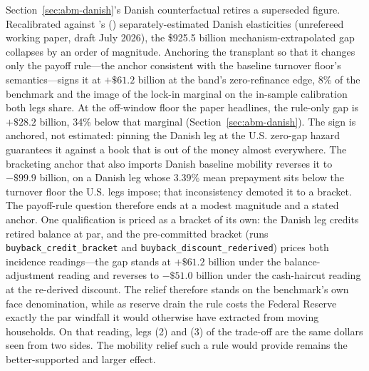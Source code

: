 \documentclass[12pt]{article}
\newcommand{\citepos}[1]{\citeauthor{#1}'s (\citeyear{#1})}
\begin{document}
Section~\ref{sec:abm-danish}'s Danish counterfactual retires a superseded figure. Recalibrated against \citepos{berger2026} separately-estimated Danish elasticities (unrefereed working paper, draft July 2026), the \$925.5 billion mechanism-extrapolated gap collapses by an order of magnitude. Anchoring the transplant so that it changes only the payoff rule---the anchor consistent with the baseline turnover floor's semantics---signs it at $+\$61.2$ billion at the band's zero-refinance edge, 8\% of the benchmark and the image of the lock-in marginal on the in-sample calibration both legs share. At the off-window floor the paper headlines, the rule-only gap is $+\$28.2$ billion, 34\% below that marginal (Section~\ref{sec:abm-danish}). The sign is anchored, not estimated: pinning the Danish leg at the U.S. zero-gap hazard guarantees it against a book that is out of the money almost everywhere. The bracketing anchor that also imports Danish baseline mobility reverses it to $-\$99.9$ billion, on a Danish leg whose 3.39\% mean prepayment sits below the turnover floor the U.S. legs impose; that inconsistency demoted it to a bracket. The payoff-rule question therefore ends at a modest magnitude and a stated anchor. One qualification is priced as a bracket of its own: the Danish leg credits retired balance at par, and the pre-committed bracket (runs \texttt{buyback\_credit\_bracket} and \texttt{buyback\_discount\_rederived}) prices both incidence readings---the gap stands at $+\$61.2$ billion under the balance-adjustment reading and reverses to $-\$51.0$ billion under the cash-haircut reading at the re-derived discount. The relief therefore stands on the benchmark's own face denomination, while as reserve drain the rule costs the Federal Reserve exactly the par windfall it would otherwise have extracted from moving households. On that reading, legs (2) and (3) of the trade-off are the same dollars seen from two sides. The mobility relief such a rule would provide remains the better-supported and larger effect.
\end{document}
